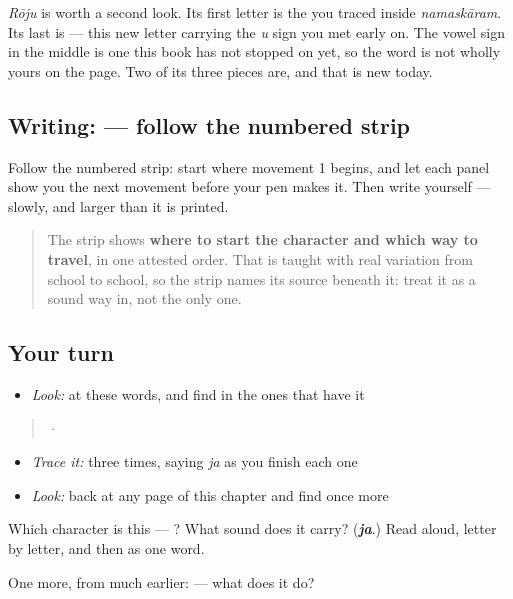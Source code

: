 \emph{Rōju} is worth a second look. Its first letter is the \textbf{} you traced inside \emph{namaskāram}. Its last is \textbf{} — this new letter carrying the \emph{u} sign you met early on. The vowel sign in the middle is one this book has not stopped on yet, so the word is not wholly yours on the page. Two of its three pieces are, and that is new today.

\subsection*{Writing:  — follow the numbered strip}

Follow the numbered strip: start where movement 1 begins, and let each panel show you the next movement before your pen makes it. Then write  yourself — slowly, and larger than it is printed.

\begin{quote}
The strip shows \textbf{where to start the character and which way to travel}, in one attested order. That is taught with real variation from school to school, so the strip names its source beneath it: treat it as a sound way in, not the only one.
\end{quote}

\subsection*{Your turn}
\begin{itemize}
\raggedright
  \item \emph{Look:} at these words, and find  in the ones that have it
\end{itemize}

\begin{quote}
  ·  
\end{quote}

\begin{itemize}
\raggedright
  \item \emph{Trace it:}  three times, saying \emph{ja} as you finish each one
  \item \emph{Look:} back at any page of this chapter and find  once more
\end{itemize}

\begin{tcolorbox}[breakable,colback=teal!4,colframe=teal!35!black,title={Before you move on}]
Which character is this — ? What sound does it carry? (\emph{\textbf{ja}}.) Read  aloud, letter by letter, and then as one word.

One more, from much earlier:  — what does it do?
\end{tcolorbox}
